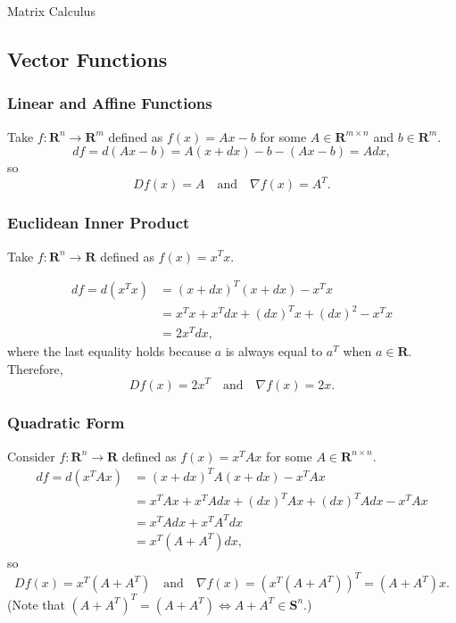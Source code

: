 \begin{chapter}{Matrix Calculus}
    \subsection{Vector Functions}

    \subsubsection*{Linear and Affine Functions}
    Take $f: \mathbf{R}^n \to \mathbf{R}^m$ defined as $f(x) = Ax - b$ for some $A \in \mathbf{R}^{m \times n}$
    and $b \in \mathbf{R}^m$.
    \[df = d(Ax - b) = A(x + dx) - b - (Ax - b) = Adx,\]
    so
    \[Df(x) = A \quad \text{and} \quad \nabla f(x) = A^T.\]

    \subsubsection*{Euclidean Inner Product}
    Take $f: \mathbf{R}^n \to \mathbf{R}$ defined as $f(x) = x^T x$.

    \[\begin{aligned}
        df = d(x^T x) &= (x + dx)^T (x + dx) - x^T x \\
        &= x^T x + x^T dx + (dx)^T x + (dx)^2 - x^Tx \\
        &= 2x^T dx,
    \end{aligned}\]
    where the last equality holds because $a$ is always equal to $a^T$ when $a \in \mathbf{R}$. 
    Therefore,
    \[Df(x) = 2x^T \quad \text{and} \quad \nabla f(x) = 2x.\]

    \subsubsection*{Quadratic Form}
    Consider $f: \mathbf{R}^n \to \mathbf{R}$ defined as $f(x) = x^T A x$ for some $A \in \mathbf{R}^{n \times n}$.
    \[\begin{aligned}
        df = d(x^TAx) &= (x + dx)^T A (x + dx) - x^T A x \\
        &= x^T A x + x^T A dx + (dx)^TAx + (dx)^T A dx - x^T A x \\
        &= x^T A dx + x^TA^Tdx \\
        &= x^T(A + A^T)dx,
    \end{aligned}\]
    so 
    \[Df(x) = x^T(A + A^T) \quad \text{and} \quad \nabla f(x) = \left(x^T(A + A^T) \right)^T = (A + A^T)x.\]
    (Note that $(A + A^T)^T = (A + A^T) \Leftrightarrow A + A^T \in \mathbf{S}^{n}$.)


\end{chapter}
